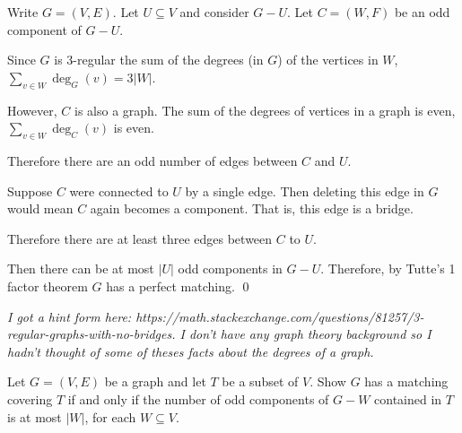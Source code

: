 \documentclass[10pt]{article}
\begin{document}
\begin{solution}

Write \( G=(V,E) \). Let \( U \subseteq V \) and consider \( G - U \). Let \( C = (W,F) \) be an odd component of \( G - U \). 

Since \( G \) is 3-regular the sum of the degrees (in \( G \)) of the vertices in \( W \), \( \sum_{v\in W} \deg_G(v) = 3|W| \).

However, \( C \) is also a graph. The sum of the degrees of vertices in a graph is even, \( \sum_{v\in W} \deg_C(v) \) is even.

Therefore there are an odd number of edges between \( C \) and \( U \).

Suppose \( C \) were connected to \( U \) by a single edge. Then deleting this edge in \( G \) would mean \( C \) again becomes a component. That is, this edge is a bridge.

Therefore there are at least three edges between \( C \) to \( U \).

Then there can be at most \( |U| \) odd components in \( G - U \). Therefore, by Tutte's 1 factor theorem \( G \) has a perfect matching. \qed



\textit{I got a hint form here: https://math.stackexchange.com/questions/81257/3-regular-graphs-with-no-bridges. I don't have any graph theory background so I hadn't thought of some of theses facts about the degrees of a graph.}






\end{solution}

\begin{problem}[Problem 5.4]
    Let \( G = (V,E) \) be a graph and let \( T \) be a subset of \( V \). Show \( G \) has a matching covering \( T \) if and only if the number of odd components of \( G-W \) contained in \( T \) is at most \( |W| \), for each \( W\subseteq V \).
\end{problem}
\end{document}
